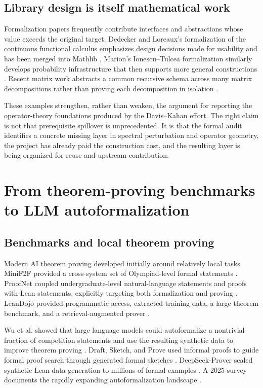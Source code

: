 \documentclass[11pt]{article}
\begin{document}
\subsection{Library design is itself mathematical work}

Formalization papers frequently contribute interfaces and abstractions whose
value exceeds the original target.  Dedecker and Loreaux's formalization of the
continuous functional calculus emphasizes design decisions made for usability
and has been merged into Mathlib \citep{dedecker2025cfc}.  Marion's Ionescu--Tulcea
formalization similarly develops probability infrastructure that then supports
more general constructions \citep{marion2025ionescu}.  Recent matrix work
abstracts a common recursive schema across many matrix decompositions rather
than proving each decomposition in isolation \citep{ma2026matrixdecompositions}.

These examples strengthen, rather than weaken, the argument for reporting the
operator-theory foundations produced by the Davis--Kahan effort.  The right
claim is not that prerequisite spillover is unprecedented.  It is that the
formal audit identifies a concrete missing layer in spectral perturbation and
operator geometry, the project has already paid the construction cost, and the
resulting layer is being organized for reuse and upstream contribution.

\section{From theorem-proving benchmarks to LLM autoformalization}
\label{sec:llm-history}

\subsection{Benchmarks and local theorem proving}

Modern AI theorem proving developed initially around relatively local tasks.
MiniF2F provided a cross-system set of Olympiad-level formal statements
\citep{zheng2022minif2f}.  ProofNet coupled undergraduate-level natural-language
statements and proofs with Lean statements, explicitly targeting both
formalization and proving \citep{azerbayev2023proofnet}.  LeanDojo provided
programmatic access, extracted training data, a large theorem benchmark, and a
retrieval-augmented prover \citep{yang2023leandojo}.

Wu et al. showed that large language models could autoformalize a nontrivial
fraction of competition statements and use the resulting synthetic data to
improve theorem proving \citep{wu2022autoformalization}.  Draft, Sketch, and
Prove used informal proofs to guide formal proof search through generated
formal sketches \citep{jiang2023dsp}.  DeepSeek-Prover scaled synthetic Lean data
generation to millions of formal examples \citep{xin2024deepseek}.  A 2025
survey documents the rapidly expanding autoformalization landscape
\citep{weng2025survey}.
\end{document}
